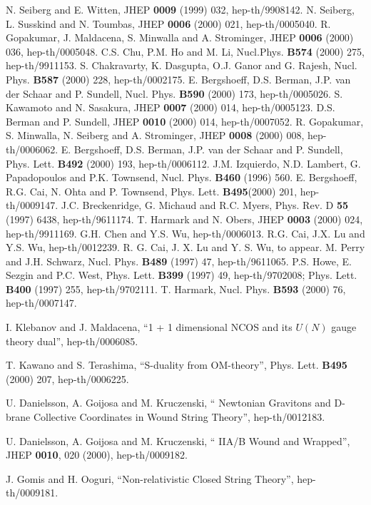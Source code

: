 \documentclass[a4paper,12pt]{article}
\begin{document}
\begin{thebibliography}{99}
N. Seiberg and E. Witten, JHEP {\bf 0009} (1999) 032,
  hep-th/9908142.
N. Seiberg, L. Susskind and N. Toumbas, JHEP {\bf 0006} (2000) 021, hep-th/0005040.
 R. Gopakumar, J. Maldacena, S. Minwalla and A. Strominger,
    JHEP {\bf 0006} (2000) 036,  hep-th/0005048.
C.S. Chu, P.M. Ho and M. Li, Nucl.Phys. {\bf B574} (2000) 275,
    hep-th/9911153.
S. Chakravarty, K. Dasgupta, O.J. Ganor and G. Rajesh,
        Nucl. Phys. {\bf B587} (2000) 228,  hep-th/0002175.
E. Bergshoeff, D.S. Berman, J.P. van der Schaar and P. Sundell,
       Nucl. Phys. {\bf B590} (2000) 173,  hep-th/0005026.
S. Kawamoto and N. Sasakura, JHEP {\bf 0007} (2000)
     014,  hep-th/0005123.
D.S. Berman and P. Sundell, JHEP {\bf 0010} (2000) 014,
    hep-th/0007052.
R. Gopakumar, S. Minwalla, N. Seiberg and A. Strominger,
         JHEP {\bf 0008} (2000) 008, hep-th/0006062.
 E. Bergshoeff, D.S. Berman, J.P. van der Schaar and P. Sundell,
     Phys. Lett. {\bf B492} (2000) 193,   hep-th/0006112.
 J.M. Izquierdo, N.D. Lambert, G. Papadopoulos and P.K.
  Townsend, Nucl. Phys. {\bf B460} (1996) 560. 
E. Bergshoeff, R.G. Cai, N. Ohta and P. Townsend, 
         Phys. Lett. {\bf B495}(2000) 201,  hep-th/0009147.
J.C. Breckenridge, G. Michaud and R.C. Myers, Phys. Rev. D
     {\bf 55} (1997) 6438, hep-th/9611174.
T. Harmark and N. Obers, JHEP {\bf 0003} (2000) 024,
    hep-th/9911169.
G.H. Chen and Y.S. Wu, hep-th/0006013.
 R.G. Cai, J.X. Lu and Y.S. Wu, hep-th/0012239.
 R. G. Cai, J. X. Lu and Y. S. Wu, to appear.
 M. Perry and J.H. Schwarz, Nucl. Phys. {\bf B489} (1997) 47,
    hep-th/9611065.
P.S. Howe, E. Sezgin and P.C. West, Phys. Lett. {\bf B399} 
    (1997) 49, hep-th/9702008; Phys. Lett. {\bf B400} (1997) 255, 
   hep-th/9702111.
T. Harmark, Nucl. Phys. {\bf B593} (2000) 76, hep-th/0007147.

 I. Klebanov and J. Maldacena, ``1 + 1 dimensional NCOS
and its $U(N)$ gauge theory dual'', hep-th/0006085.

 T. Kawano and S. Terashima, ``S-duality from OM-theory'',
Phys. Lett. {\bf B495} (2000) 207, hep-th/0006225.

 U. Danielsson, A. Goijosa and M. Kruczenski, ``
Newtonian Gravitons and D-brane Collective Coordinates in Wound 
String Theory'', hep-th/0012183.

  U. Danielsson, A. Goijosa and M. Kruczenski, ``
IIA/B Wound and Wrapped'', JHEP {\bf 0010}, 020 (2000), hep-th/0009182.

 J. Gomis and H. Ooguri, ``Non-relativistic Closed String
Theory'', hep-th/0009181.

\end{thebibliography}
\end{document}
